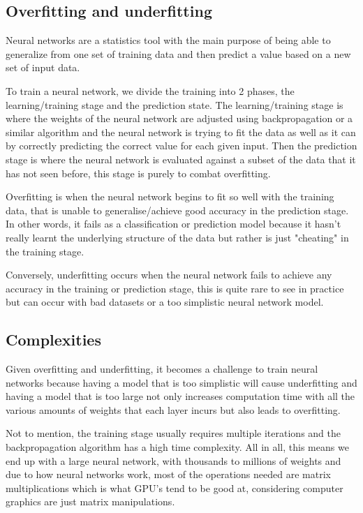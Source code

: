 \documentclass[a4paper,oneside,phd,etd]{BYUPhys}
\begin{document}
\subsection{Overfitting and underfitting}
Neural networks are a statistics tool with the main purpose of being able to generalize from one set of training data and then predict a value based on a new set of input data. 

To train a neural network, we divide the training into 2 phases, the learning/training stage and the prediction state. The learning/training stage is where the weights of the neural network are adjusted using backpropagation or a similar algorithm and the neural network is trying to fit the data as well as it can by correctly predicting the correct value for each given input. Then the prediction stage is where the neural network is evaluated against a subset of the data that it has not seen before, this stage is purely to combat overfitting. %

Overfitting is when the neural network begins to fit so well with the training data, that is unable to generalise/achieve good accuracy in the prediction stage. In other words, it fails as a classification or prediction model because it hasn't really learnt the underlying structure of the data but rather is just "cheating" in the training stage.

Conversely, underfitting occurs when the neural network fails to achieve any accuracy in the training or prediction stage, this is quite rare to see in practice but can occur with bad datasets or a too simplistic neural network model\cite{underfitting-machine-learning}.

\subsection{Complexities}
Given overfitting and underfitting, it becomes a challenge to train neural networks because having a model that is too simplistic will cause underfitting and having a model that is too large not only increases computation time with all the various amounts of weights that each layer incurs but also leads to overfitting\cite{model-complexity}. 

Not to mention, the training stage usually requires multiple iterations and the backpropagation algorithm has a high time complexity\cite{backprop-time-complexity}. All in all, this means we end up with a large neural network, with thousands to millions of weights and due to how neural networks work, most of the operations needed are matrix multiplications which is what GPU's tend to be good at, considering computer graphics are just matrix manipulations.
\end{document}
